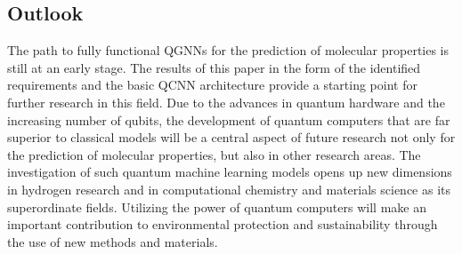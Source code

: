 \subsection{Outlook}
The path to fully functional QGNNs for the prediction of molecular properties is still at an early stage. The results of this paper in the form of the identified requirements and the basic QCNN architecture provide a starting point for further research in this field. Due to the advances in quantum hardware and the increasing number of qubits, the development of quantum computers that are far superior to classical models will be a central aspect of future research not only for the prediction of molecular properties, but also in other research areas. The investigation of such quantum machine learning models opens up new dimensions in hydrogen research and in computational chemistry and materials science as its superordinate fields. Utilizing the power of quantum computers will make an important contribution to environmental protection and sustainability through the use of new methods and materials.
